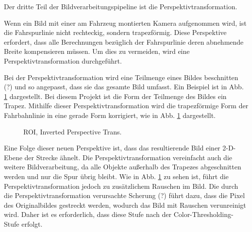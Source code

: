 \documentclass[arbeit=studie,oneside,BCOR=12mm]{ArbeitRST}
\begin{document}
Der dritte Teil der Bildverarbeitungspipeline ist die Perspektivtransformation. 

Wenn ein Bild mit einer am Fahrzeug montierten Kamera aufgenommen wird, ist die
Fahrspurlinie nicht rechteckig, sondern trapezförmig. Diese Perspektive
erfordert, dass alle Berechnungen bezüglich der Fahrspurlinie deren abnehmende
Breite kompensieren müssen. Um dies zu vermeiden, wird eine
Perspektivtransformation durchgeführt. 

Bei der Perspektivtransformation wird eine Teilmenge eines Bildes beschnitten
(?) und so angepasst, dass sie das gesamte Bild umfasst. Ein Beispiel ist in
Abb. \ref{roi-pt} dargestellt. Bei diesem Projekt ist die Form der Teilmenge des Bildes
ein Trapez. Mithilfe dieser Perspektivtransformation wird die trapezförmige
Form der Fahrbahnlinie in eine gerade Form korrigiert, wie in Abb. \ref{roi-pt}
dargestellt. \\

\begin{figure}[h]
    \centering
    \caption{ROI, Inverted Perspective Trans.}
    \label{roi-pt}
\end{figure}

Eine Folge dieser neuen Perspektive ist, dass das resultierende Bild einer
2-D-Ebene der Strecke ähnelt. Die Perspektivtransformation vereinfacht auch die
weitere Bildverarbeitung, da alle Objekte außerhalb des Trapezes abgeschnitten
werden und nur die Spur übrig bleibt. Wie in Abb. \ref{roi-pt} zu sehen ist, führt die
Perspektivtransformation jedoch zu zusätzlichem Rauschen im Bild. Die durch die
Perspektivtransformation verursachte Scherung (?) führt dazu, dass die Pixel des
Originalbildes gestreckt werden, wodurch das Bild mit Rauschen verunreinigt
wird. Daher ist es erforderlich, dass diese Stufe nach der
\glqq Color-Thresholding\grqq-Stufe erfolgt.
\end{document}
